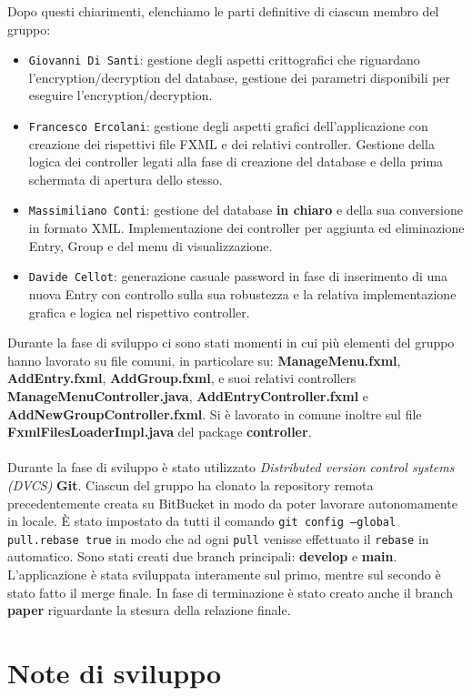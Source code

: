 \documentclass[a4paper,12pt]{report}
\begin{document}
Dopo questi chiarimenti, elenchiamo le parti definitive di ciascun membro del gruppo:
\begin{itemize}
    \item \texttt{Giovanni Di Santi}: gestione degli aspetti crittografici che riguardano l'encryption/decryption
 del database, gestione dei parametri disponibili per eseguire l'encryption/decryption.
    \item \texttt{Francesco Ercolani}: gestione degli aspetti grafici dell'applicazione con creazione dei 
rispettivi file FXML e dei relativi controller. Gestione della logica dei controller legati alla fase di creazione del database e della prima schermata di apertura dello stesso.
    \item \texttt{Massimiliano Conti}: gestione del database \textbf{in chiaro} e della sua conversione in formato XML. 
Implementazione dei controller per aggiunta ed eliminazione Entry, Group e del menu di visualizzazione.
    \item \texttt{Davide Cellot}: generazione casuale password in fase di inserimento di una nuova 
Entry con controllo sulla sua robustezza e la relativa implementazione grafica e logica nel rispettivo controller.
\end{itemize}
Durante la fase di sviluppo ci sono stati momenti in cui più elementi del gruppo hanno lavorato su file comuni, 
in particolare su: \textbf{ManageMenu.fxml}, \textbf{AddEntry.fxml}, \textbf{AddGroup.fxml}, e suoi relativi controllers \textbf{ManageMenuController.java}, \textbf{AddEntryController.fxml} e \textbf{AddNewGroupController.fxml}. Si è lavorato in comune inoltre sul file \textbf{FxmlFilesLoaderImpl.java} del package \textbf{controller}.\\\\
Durante la fase di sviluppo è stato utilizzato \textit{Distributed version control systems (DVCS)} \textbf{Git}. 
Ciascun del gruppo ha clonato la repository remota precedentemente creata su BitBucket in modo da poter lavorare 
autonomamente in locale. È stato impostato da tutti il comando \texttt{git config --global pull.rebase true} 
in modo che ad ogni \texttt{pull} venisse effettuato il \texttt{rebase} in automatico.
Sono stati creati due branch principali: \textbf{develop} e \textbf{main}. L'applicazione è stata sviluppata
 interamente sul primo, mentre sul secondo è stato fatto il merge finale. 
In fase di terminazione è stato creato anche il branch \textbf{paper} riguardante la stesura della relazione finale.


\section{Note di sviluppo}
\end{document}
